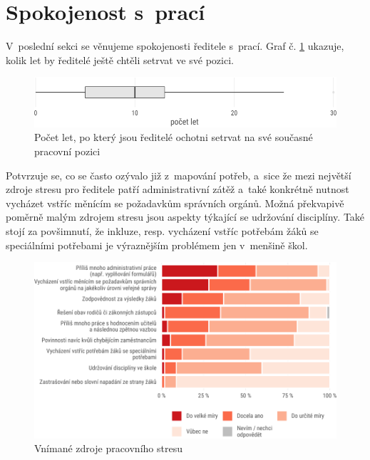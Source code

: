 \documentclass[12pt,a4paper,]{report}
\begin{document}
\hypertarget{spokojenost-s-pracuxed}{%
\section{\texorpdfstring{Spokojenost s~prací}{Spokojenost sprací}}\label{spokojenost-s-pracuxed}}

V~poslední sekci se věnujeme spokojenosti ředitele s~prací. Graf č. \ref{fig:motiv} ukazuje, kolik let by ředitelé ještě chtěli setrvat ve své pozici.

\begin{figure}

{\centering \includegraphics[width=\textwidth]{figs/motiv-1} 

}

\caption{Počet let, po který jsou ředitelé ochotni setrvat na své současné pracovní pozici}\label{fig:motiv}
\end{figure}

Potvrzuje se, co se často ozývalo již z~mapování potřeb, a~sice že mezi největší zdroje stresu pro ředitele patří administrativní zátěž a~také konkrétně nutnost vycházet vstříc měnícím se požadavkům správních orgánů. Možná překvapivě poměrně malým zdrojem stresu jsou aspekty týkající se udržování disciplíny. Také stojí za povšimnutí, že inkluze, resp. vycházení vstříc potřebám žáků se speciálními potřebami je výraznějším problémem jen v~menšině škol.

\begin{figure}

{\centering \includegraphics[width=\textwidth]{figs/stress-1} 

}

\caption{Vnímané zdroje pracovního stresu}\label{fig:stress}
\end{figure}
\end{document}
